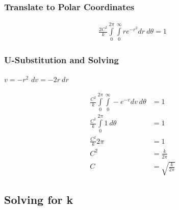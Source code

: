 \documentclass{article}
\begin{document}
\subsubsection{Translate to Polar Coordinates}

\begin{align}
  \frac{2C^2}{k}\int\limits_{0}^{2\pi}\int\limits_{0}^{\infty}re^{-r^2} dr\ d\theta = 1
\end{align}

\subsubsection{U-Substitution and Solving}

\begin{multicols}{2}
  $v = -r^2$
  \vfill\columnbreak
  $dv = -2r\ dr$
\end{multicols}

\begin{align}
  \frac{C^2}{k}\int\limits_{0}^{2\pi}\int\limits_{0}^{\infty}-e^{-v}dv\ d\theta &= 1\\
  \frac{C^2}{k}\int\limits_{0}^{2\pi}1\ d\theta &= 1\\
  \frac{C^2}{k}2\pi &= 1\\
  C^2 &= \frac{k}{2\pi}\\
  C &= \sqrt{\frac{k}{2\pi}}
\end{align}

\subsection{Solving for k}
\end{document}
